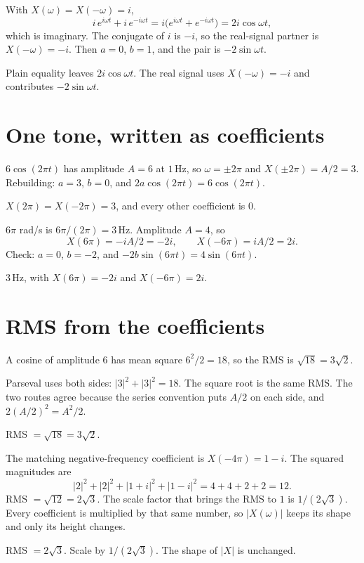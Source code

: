 \documentclass[11pt,letterpaper]{article}
\newcommand{\ans}[1]{\par\vspace{2pt}{\bfseries #1}\quad}
\begin{document}
\ans{2.}
With $X(\omega) = X(-\omega) = i$,
\[
i\,e^{i\omega t} + i\,e^{-i\omega t} = i\bigl(e^{i\omega t} + e^{-i\omega t}\bigr) = 2i\cos\omega t,
\]
which is imaginary. The conjugate of $i$ is $-i$, so the real-signal partner is $X(-\omega) = -i$. Then $a = 0$, $b = 1$, and the pair is $-2\sin\omega t$.
\begin{result}
Plain equality leaves $2i\cos\omega t$. The real signal uses $X(-\omega) = -i$ and contributes $-2\sin\omega t$.
\end{result}

\section{One tone, written as coefficients}

\ans{1.}
$6\cos(2\pi t)$ has amplitude $A = 6$ at $1\,\mathrm{Hz}$, so $\omega = \pm 2\pi$ and $X(\pm 2\pi) = A/2 = 3$. Rebuilding: $a = 3$, $b = 0$, and $2a\cos(2\pi t) = 6\cos(2\pi t)$.
\begin{result}
$X(2\pi) = X(-2\pi) = 3$, and every other coefficient is $0$.
\end{result}

\ans{2.}
$6\pi$ rad/s is $6\pi/(2\pi) = 3\,\mathrm{Hz}$. Amplitude $A = 4$, so
\[
X(6\pi) = -iA/2 = -2i, \qquad X(-6\pi) = iA/2 = 2i.
\]
Check: $a = 0$, $b = -2$, and $-2b\sin(6\pi t) = 4\sin(6\pi t)$.
\begin{result}
$3\,\mathrm{Hz}$, with $X(6\pi) = -2i$ and $X(-6\pi) = 2i$.
\end{result}

\section{RMS from the coefficients}

\ans{1.}
A cosine of amplitude $6$ has mean square $6^2/2 = 18$, so the RMS is $\sqrt{18} = 3\sqrt{2}$.

Parseval uses both sides: $|3|^2 + |3|^2 = 18$. The square root is the same RMS. The two routes agree because the series convention puts $A/2$ on each side, and $2(A/2)^2 = A^2/2$.
\begin{result}
RMS $= \sqrt{18} = 3\sqrt{2}$.
\end{result}

\ans{2.}
The matching negative-frequency coefficient is $X(-4\pi) = 1 - i$. The squared magnitudes are
\[
|2|^2 + |2|^2 + |1+i|^2 + |1-i|^2 = 4 + 4 + 2 + 2 = 12.
\]
RMS $= \sqrt{12} = 2\sqrt{3}$. The scale factor that brings the RMS to $1$ is $1/(2\sqrt{3})$. Every coefficient is multiplied by that same number, so $|X(\omega)|$ keeps its shape and only its height changes.
\begin{result}
RMS $= 2\sqrt{3}$. Scale by $1/(2\sqrt{3})$. The shape of $|X|$ is unchanged.
\end{result}
\end{document}
